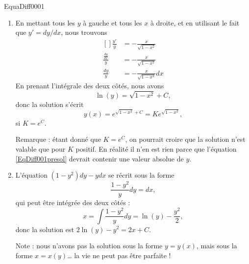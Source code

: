 \begin{corrige}{EquaDiff0001}

\begin{enumerate}

\item
En mettant tous les $y$ à gauche et tous les $x$ à droite, et en utilisant le fait que $y'=dy/dx$, nous trouvons
\begin{equation}
	\begin{aligned}[]
		\frac{ y' }{ y }&=-\frac{ x }{ \sqrt{1-x^2} }\\
		\frac{ \frac{ dy }{ dx } }{ y }&=-\frac{ x }{ \sqrt{1-x^2} }\\
		\frac{ dy }{ y }&=-\frac{ x }{ \sqrt{1-x^2} }dx
	\end{aligned}
\end{equation}
En prenant l'intégrale des deux côtés, nous avons
\begin{equation}		\label{EqDiff001presol}
	\ln(y)=\sqrt{1-x^2}+C,
\end{equation}
donc la solution s'écrit
\begin{equation}
	y(x)= e^{\sqrt{1-x^2}+C}=K e^{\sqrt{1-x^2}},
\end{equation}
si $K=e^C$.

Remarque : étant donné que $K=e^C$, on pourrait croire que la solution n'est valable que pour $K$ positif. En réalité il n'en est rien parce que l'équation \eqref{EqDiff001presol} devrait contenir une valeur absolue de $y$.

\item
L'équation $(1-y^2)dy-ydx$ se récrit sous la forme 
\begin{equation}
	\frac{ 1-y^2 }{ y }dy=dx,
\end{equation}
qui peut être intégrée des deux côtés :
\begin{equation}
	x=\int \frac{ 1-y^2 }{ y }dy=\ln(y)-\frac{ y^2 }{2},
\end{equation}
donc la solution est $2\ln(y)-y^2=2x+C$. 

Note : nous n'avons pas la solution sous la forme $y=y(x)$, mais sous la forme $x=x(y)$\ldots{} la vie ne peut pas être parfaite !

\end{enumerate}

\end{corrige}
